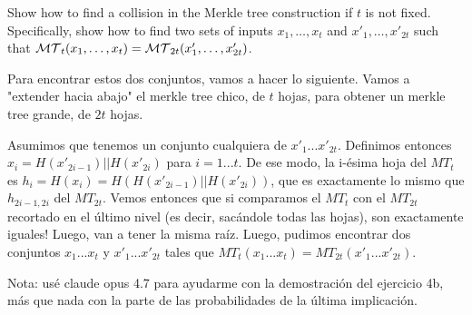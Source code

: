 \documentclass[12pt,addpoints,answers]{exam}
\begin{document}
\begin{questions}
\begin{parts}
\begin{solution}
\end{solution}
\end{parts}

\question[10] Show how to find a collision in the Merkle tree construction if $t$ is not fixed. Specifically, show how to find two sets of inputs $x_1,\ldots,x_t$ and $x'_1,\ldots,x'_{2t}$ such that ${\cal MT}_t(x_1,\ldots,x_t)={\cal MT}_{2t}(x'_1,\ldots,x'_{2t})$.
\begin{solution}
  Para encontrar estos dos conjuntos, vamos a hacer lo siguiente. Vamos a "extender hacia abajo" el merkle tree chico, de $t$ hojas, para obtener un merkle tree grande, de $2t$ hojas. 

  Asumimos que tenemos un conjunto cualquiera de $x'_1...x'_{2t}$. Definimos entonces $x_i = H(x'_{2i-1}) || H(x'_{2i})$ para $i = 1...t$. De ese modo, la i-ésima hoja del $MT_t$ es $h_i = H(x_i) = H(H(x'_{2i-1}) || H(x'_{2i}))$, que es exactamente lo mismo que $h_{2i-1,2i}$ del $MT_{2t}$. Vemos entonces que si comparamos el $MT_t$ con el $MT_{2t}$ recortado en el último nivel (es decir, sacándole todas las hojas), son exactamente iguales! 
  Luego, van a tener la misma raíz. Luego, pudimos encontrar dos conjuntos $x_1...x_t$ y $x'_1...x'_{2t}$ tales que $MT_t(x_1...x_t) = MT_{2t}(x'_1...x'_{2t})$.
\end{solution}


\end{questions}


Nota: usé claude opus 4.7 para ayudarme con la demostración del ejercicio 4b, más que nada con la parte de las probabilidades de la última implicación. 
\end{document}
